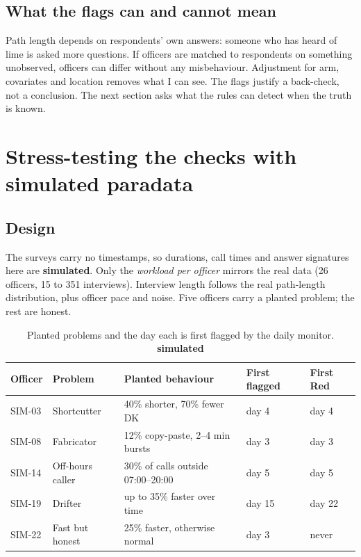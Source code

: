 \documentclass[11pt,a4paper]{article}
\newcommand{\simd}{\textcolor{amber}{\sffamily\bfseries simulated}}
\begin{document}
\subsection{What the flags can and cannot mean}
\begin{warn}
Path length depends on respondents' own answers: someone who has heard of lime is asked more questions. If officers are matched to respondents on something unobserved, officers can differ without any misbehaviour. Adjustment for arm, covariates and location removes what I can see. The flags justify a back-check, not a conclusion. The next section asks what the rules can detect when the truth is known.
\end{warn}

\section{Stress-testing the checks with simulated paradata}\label{sec:sim}
\subsection{Design}
The surveys carry no timestamps, so durations, call times and answer signatures here are \simd{}. Only the \emph{workload per officer} mirrors the real data (26 officers, 15 to 351 interviews). Interview length follows the real path-length distribution, plus officer pace and noise. Five officers carry a planted problem; the rest are honest.
\begin{table}[H]\centering\small\setlength{\tabcolsep}{4pt}\begin{tabular}{lllll}
\toprule
Officer & Problem & Planted behaviour & First flagged & First Red \\
\midrule
SIM-03 & Shortcutter & 40\% shorter, 70\% fewer DK & day 4 & day 4 \\
SIM-08 & Fabricator & 12\% copy-paste, 2--4 min bursts & day 3 & day 3 \\
SIM-14 & Off-hours caller & 30\% of calls outside 07:00--20:00 & day 5 & day 5 \\
SIM-19 & Drifter & up to 35\% faster over time & day 15 & day 22 \\
SIM-22 & Fast but honest & 25\% faster, otherwise normal & day 3 & never \\
\bottomrule
\end{tabular}\caption{Planted problems and the day each is first flagged by the daily monitor. \simd}\label{tab:sim}\end{table}
\end{document}
